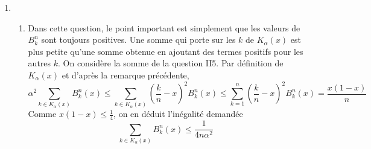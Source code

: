 \begin{enumerate}
 \item
\begin{enumerate}
 \item Dans cette question, le point important est simplement que les valeurs de $B^n_k$ sont toujours positives. Une somme qui porte sur les $k$ de $K_\alpha(x)$ est plus petite qu'une somme obtenue en ajoutant des termes positifs pour les autres $k$.\newline
 On considère la somme de la question II5. Par définition de $K_\alpha(x)$ et d'après la remarque précédente,
\begin{displaymath}
 \alpha^2\sum_{k\in K_\alpha(x)}B^n_k(x) \leq \sum_{k\in K_\alpha(x)}(\frac{k}{n}-x)^2 B^n_k(x)
\leq \sum_{k = 1}^n(\frac{k}{n}-x)^2 B^n_k(x)
=\frac{x(1-x)}{n}
\end{displaymath}
Comme $x(1-x)\leq \frac{1}{4}$, on en déduit l'inégalité demandée
\begin{displaymath}
 \sum_{k\in K_\alpha(x)}B^n_k(x) \leq \frac{1}{4n\alpha^2}
\end{displaymath}


\end{enumerate}
\end{enumerate}
